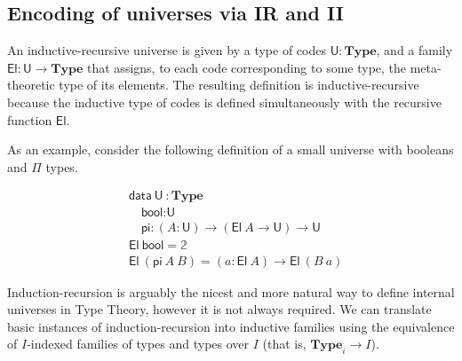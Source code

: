 \documentclass{easychair}
\newcommand{\mType}{\mathbf{Type}}
\newcommand{\U}{\textsf{U}}
\newcommand{\El}{\textsf{El}}
\providecommand\mathbbm{\mathbb}
\begin{document}

\subsection{Encoding of universes via IR and II}

An inductive-recursive universe is given by a type of codes $\U : \mType$, and a
family $\El : \U \to \mType$ that assigns, to each code corresponding to some
type, the meta-theoretic type of its elements. The resulting definition is
inductive-recursive because the inductive type of codes is defined
simultaneously with the recursive function $\El$.

As an example, consider the following definition of a small universe with
booleans and $\Pi$ types.

\begin{align*}
  & \textsf{data}\ \U\ : \mType \\
  & \quad \textsf{bool} : \U \\
  & \quad \textsf{pi} : (A : \U) \to (\El\ A \to \U) \to \U \\
  & \El\ \textsf{bool} = \mathbbm{2} \\
  & \El\ (\textsf{pi}\ A\ B) = (a : \El\ A) \to \El\ (B\ a)
\end{align*}


Induction-recursion is arguably the nicest and more natural way to define
internal universes in Type Theory, however it is not always required.
%
We can translate basic instances of induction-recursion into inductive families
using the equivalence of $I$-indexed families of types and types over $I$
(that is, $\mType_i \to I$).
\end{document}

